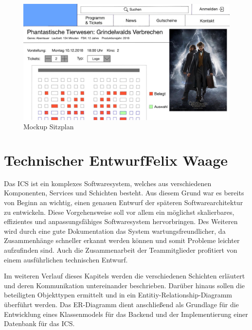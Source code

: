 		\begin{figure}[H]
			\centering 
			\includegraphics[width=12cm]{img/mockUp3.png}
			\captionsetup{format=hang}
			\caption[Mockup Sitzplan]{\label{fig:mockUpSitzplan} Mockup Sitzplan }
		\end{figure}
		
		
	
	\section[Technischer Entwurf]{Technischer Entwurf{\hfill \normalsize Felix Waage}} 	

		Das \ac{ICS} ist ein komplexes Softwaresystem, welches aus verschiedenen Komponenten, Services und Schichten besteht. Aus diesem Grund war es bereits von Beginn an wichtig, einen genauen Entwurf der späteren Softwarearchitektur zu entwickeln. Diese Vorgehensweise soll vor allem ein möglichst skalierbares, effizientes und anpassungsfähiges Softwaresystem hervorbringen. Des Weiteren wird durch eine gute Dokumentation das System wartungsfreundlicher, da Zusammenhänge schneller erkannt werden können und somit Probleme leichter aufzufinden sind. Auch die Zusammenarbeit der Teammitglieder profitiert von einem ausführlichen technischen Entwurf.
		
			Im weiteren Verlauf dieses Kapitels werden die verschiedenen Schichten erläutert und deren Kommunikation untereinander beschrieben. Darüber hinaus sollen die beteiligten Objekttypen ermittelt und in ein Entitiy-Relationship-Diagramm überführt werden. Das ER-Diagramm dient anschließend als Grundlage für die Entwicklung eines Klassenmodels für das Backend und der Implementierung einer Datenbank für das ICS. 
			
